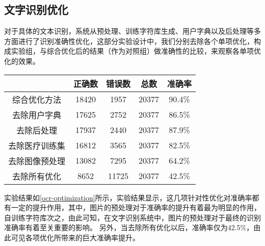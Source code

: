 \subsection{文字识别优化}
对于具体的文本识别，系统从预处理、训练字符库生成、用户字典以及后处理等多方面进行了识别准确性优化，这部分实验设计中，我们分别去除各个单项优化，构成实验组，与综合优化后的结果（作为对照组）做准确性的比较，来观察各单项优化的效果。
\begin{table}[!htbp]
	\label{ocr-optimization}
	\centering
	\vspace{10pt}
  \renewcommand\arraystretch{1.5}  %
	\begin{tabular}{c||c|c|c|c}
    \hline
    & 正确数 & 错误数 & 总数 & 准确率 \\
		\hline
    综合优化方法 & 18420 & 1957 & 20377 & 90.4\% \\
		\hline
    去除用户字典 & 17625 & 2752 & 20377 & 86.5\% \\
		\hline
    去除后处理 & 17937 & 2440 & 20377 & 87.9\% \\
		\hline
    去除医疗训练集 & 16812 & 3565 & 20377 & 82.5\% \\
		\hline
    去除图像预处理 & 13082 & 7295 & 20377 & 64.2\% \\
		\hline
    去除所有优化 & 8652 & 11725 & 20377 & 42.5\% \\
    \hline
	\end{tabular}
\end{table}
实验结果如\autoref{ocr-optimization}所示，实验结果显示，这几项针对性优化对准确率都有一定的提升作用，其中，图片的预处理对于准确率的提升有着最为明显的作用，自训练字符库次之，由此可知，在文字识别系统中，图片的预处理对于最终的识别准确率有着至关重要的影响。
另外，当去除所有优化以后，准确率仅为42.5\%，由此可见各项优化所带来的巨大准确率提升。

